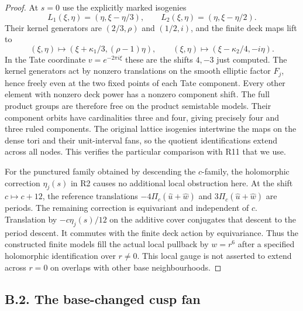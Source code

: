 \begin{proof}
At $s=0$ use the explicitly marked isogenies
\[
 L_1(\xi,\eta)=(\eta,\xi-\eta/3),\qquad
 L_2(\xi,\eta)=(\eta,\xi-\eta/2).
\]
Their kernel generators are $(2/3,\rho)$ and $(1/2,i)$,
and the finite deck maps lift to
\[
 (\xi,\eta)\mapsto(\xi+\kappa_1/3,(\rho-1)\eta),
 \qquad
 (\xi,\eta)\mapsto(\xi-\kappa_2/4,-i\eta).
\]
In the Tate coordinate $v=e^{-2\pi i\xi}$ these are the
shifts $4,-3$ just computed. The kernel generators act
by nonzero translations on the smooth elliptic factor
$F_j$, hence freely even at the two fixed points of each
Tate component. Every other element with nonzero deck
power has a nonzero component shift. The full product
groups are therefore free on the product semistable
models. Their component orbits have cardinalities three
and four, giving precisely four and three ruled
components. The original lattice isogenies intertwine
the maps on the dense tori and their unit-interval fans,
so the quotient identifications extend across all nodes.
This verifies the particular comparison with R11 that
we use.

For the punctured family obtained by descending the
$c$-family, the holomorphic correction $\eta_j(s)$ in
R2 causes no additional local obstruction here. At the
shift $c\mapsto c+12$, the reference translations
$-4\Pi_c(\widehat u+\widehat w)$ and
$3\Pi_c(\widehat u+\widehat w)$ are periods.
The remaining correction is equivariant and independent
of $c$. Translation by $-c\eta_j(s)/12$ on the additive
cover conjugates that descent to the period descent.
It commutes with the finite deck action by equivariance.
Thus the constructed finite models fill the actual local
pullback by $w=r^6$ after a specified holomorphic
identification over $r\ne0$. This local gauge is not
asserted to extend across $r=0$ on overlaps with other
base neighbourhoods.
\end{proof}

\subsection{B.2. The base-changed cusp fan}

